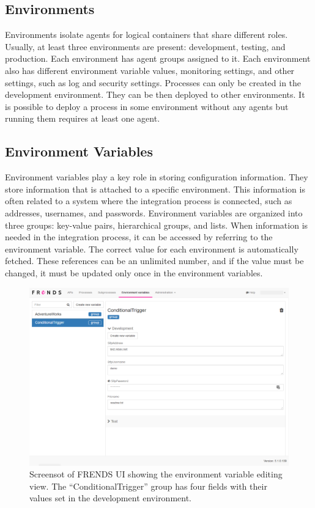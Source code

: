 \documentclass[english, 12pt, a4paper, sci, utf8, a-2b, online, obeyspaces]{aaltothesis}
\begin{document}
\subsection{Environments}
Environments isolate agents for logical containers that share different roles. Usually, at least three environments are present: development, testing, and production. Each environment has agent groups assigned to it. Each environment also has different environment variable values, monitoring settings, and other settings, such as log and security settings. Processes can only be created in the development environment. They can be then deployed to other environments. It is possible to deploy a process in some environment without any agents but running them requires at least one agent. 

\subsection{Environment Variables}
\label{sec:environment_variables}
Environment variables play a key role in storing configuration information. They store information that is attached to a specific environment. This information is often related to a system where the integration process is connected, such as addresses, usernames, and passwords. Environment variables are organized into three groups: key-value pairs, hierarchical groups, and lists. When information is needed in the integration process, it can be accessed by referring to the environment variable. The correct value for each environment is automatically fetched. These references can be an unlimited number, and if the value must be changed, it must be updated only once in the environment variables. 

\begin{figure}[htb]
  \centering
      \includegraphics[width=\textwidth]{pictures/frends/Adventureworks_Env_Parameters.png}
  \caption{Screensot of FRENDS UI showing the environment variable editing view. The “ConditionalTrigger” group has four fields with their values set in the development environment.}
  \label{fig:env_parameters_editor}
\end{figure}
\end{document}
